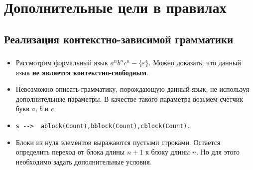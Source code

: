 \section{Дополнительные цели в правилах}

\begin{frame}

	\begin{center}
		\Huge \insertsection
	\end{center}

\end{frame}


\subsection{Реализация контекстно-зависимой грамматики}

\begin{frame}

	\frametitle{\insertsection}
	\framesubtitle{\insertsubsection}
	
	\begin{itemize}
		\item Рассмотрим формальный язык \(a^nb^nc^n-\{\varepsilon \}\). Можно доказать, что данный язык \textbf{не является контекстно-свободным}.
		\item Невозможно описать грамматику, порождающую данный язык, не используя дополнительные параметры. В качестве такого параметра возьмем счетчик букв \(a\), \(b\) и \(c\).
		\item \texttt{s -{}-\textgreater~ ablock(Count),bblock(Count),cblock(Count).}
		\item Блоки из нуля элементов выражаются пустыми строками. Остается определить переход от блока длины \(n+1\) к блоку длины \(n\). Но для этого необходимо задать дополнительные условия.
	\end{itemize}

\end{frame}




